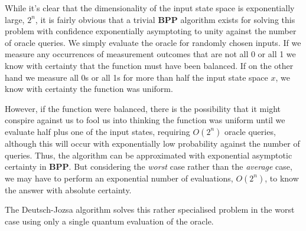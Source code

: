 While it's clear that the dimensionality of the input state space is exponentially large, $2^n$, it is fairly obvious that a trivial \textbf{BPP} algorithm exists for solving this problem with confidence exponentially asymptoting to unity against the number of oracle queries. We simply evaluate the oracle for randomly chosen inputs. If we measure any occurrences of measurement outcomes that are not all 0 or all 1 we know with certainty that the function must have been balanced. If on the other hand we measure all 0s or all 1s for more than half the input state space $x$, we know with certainty the function was uniform.

However, if the function were balanced, there is the possibility that it might conspire against us to fool us into thinking the function was uniform until we evaluate half plus one of the input states, requiring $O(2^n)$ oracle queries, although this will occur with exponentially low probability against the number of queries. Thus, the algorithm can be approximated with exponential asymptotic certainty in \textbf{BPP}. But considering the \textit{worst} case rather than the \textit{average} case, we may have to perform an exponential number of evaluations, $O(2^n)$, to know the answer with absolute certainty.

The Deutsch-Jozsa algorithm solves this rather specialised problem in the worst case using only a single quantum evaluation of the oracle.

